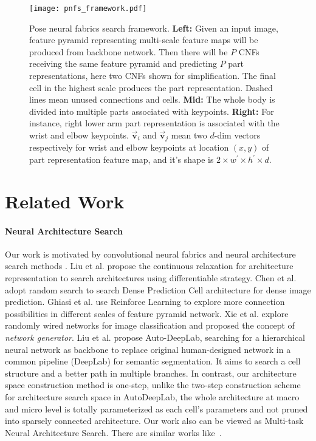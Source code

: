 \documentclass[journal]{IEEEtran}
\begin{document}
\begin{figure*}[h]
	\begin{center}
\texttt{[image: pnfs\_framework.pdf]}
	\end{center}
	\caption{Pose neural fabrics search framework. \textbf{Left:} Given an input image, feature pyramid representing multi-scale feature maps will be produced from backbone network. Then there will be $P$ CNFs receiving the same feature pyramid and predicting $P$ part representations, here two CNFs shown for simplification. The final cell in the highest scale produces the part representation. Dashed lines mean unused connections and cells. \textbf{Mid:} The whole body is divided into multiple parts associated with keypoints.  \textbf{Right:} For instance, right lower arm part representation is associated with the wrist and elbow keypoints. $\vec{\mathbf{v}}_i$ and $\vec{\mathbf{v}}_j$ mean two $d$-dim vectors respectively for wrist and elbow keypoints at location $(x,y)$ of part representation feature map, and it's shape is $2 \times w^{'} \times h^{'} \times d $.}
	\label{framework}
\end{figure*}


\section{Related Work}

\paragraph{Neural Architecture Search} Our work is motivated by convolutional neural fabrics \cite{saxena2016convolutional} and neural architecture search methods \cite{liu2018darts,chen2018searching,liu2019auto,Xie_2019_ICCV}. Liu et al. \cite{liu2018darts} propose the continuous relaxation for architecture representation to search architectures using differentiable strategy. Chen et al. \cite{chen2018searching} adopt random search to search Dense Prediction Cell architecture for dense image prediction. Ghiasi et al. \cite{Ghiasi_2019_CVPR} use Reinforce Learning to explore more connection possibilities in different scales of feature pyramid network. Xie et al. \cite{Xie_2019_ICCV} explore randomly wired networks for image classification and proposed the concept of \emph{network generator}.  Liu et al. \cite{liu2019auto} propose Auto-DeepLab, searching for a hierarchical neural network as backbone to replace original human-designed network in a common pipeline (DeepLab) for semantic segmentation. It aims to search a cell structure and a better path in multiple branches. In contrast, our architecture space construction method is one-step, unlike the two-step construction scheme for architecture search space in AutoDeepLab, the whole architecture at macro and micro level is totally parameterized as each cell's parameters and not pruned into sparsely connected architecture. Our work also can be viewed as Multi-task Neural Architecture Search. There are similar works like~\cite{liang2018evolutionary, newell2019feature, gao2020mtl}.
\end{document}
